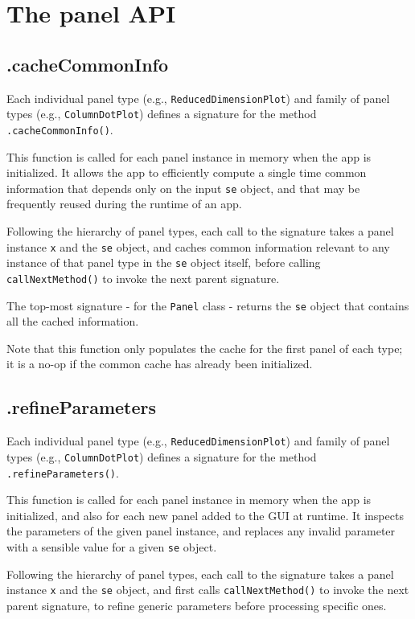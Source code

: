 \documentclass[]{book}
\begin{document}
\chapter{The panel API}\label{api}

\section{.cacheCommonInfo}\label{cachecommoninfo}

Each individual panel type (e.g., \texttt{ReducedDimensionPlot}) and
family of panel types (e.g., \texttt{ColumnDotPlot}) defines a signature
for the method \texttt{.cacheCommonInfo()}.

This function is called for each panel instance in memory when the app
is initialized. It allows the app to efficiently compute a single time
common information that depends only on the input \texttt{se} object,
and that may be frequently reused during the runtime of an app.

Following the hierarchy of panel types, each call to the signature takes
a panel instance \texttt{x} and the \texttt{se} object, and caches
common information relevant to any instance of that panel type in the
\texttt{se} object itself, before calling \texttt{callNextMethod()} to
invoke the next parent signature.

The top-most signature - for the \texttt{Panel} class - returns the
\texttt{se} object that contains all the cached information.

Note that this function only populates the cache for the first panel of
each type; it is a no-op if the common cache has already been
initialized.

\section{.refineParameters}\label{refineparameters}

Each individual panel type (e.g., \texttt{ReducedDimensionPlot}) and
family of panel types (e.g., \texttt{ColumnDotPlot}) defines a signature
for the method \texttt{.refineParameters()}.

This function is called for each panel instance in memory when the app
is initialized, and also for each new panel added to the GUI at runtime.
It inspects the parameters of the given panel instance, and replaces any
invalid parameter with a sensible value for a given \texttt{se} object.

Following the hierarchy of panel types, each call to the signature takes
a panel instance \texttt{x} and the \texttt{se} object, and first calls
\texttt{callNextMethod()} to invoke the next parent signature, to refine
generic parameters before processing specific ones.
\end{document}
